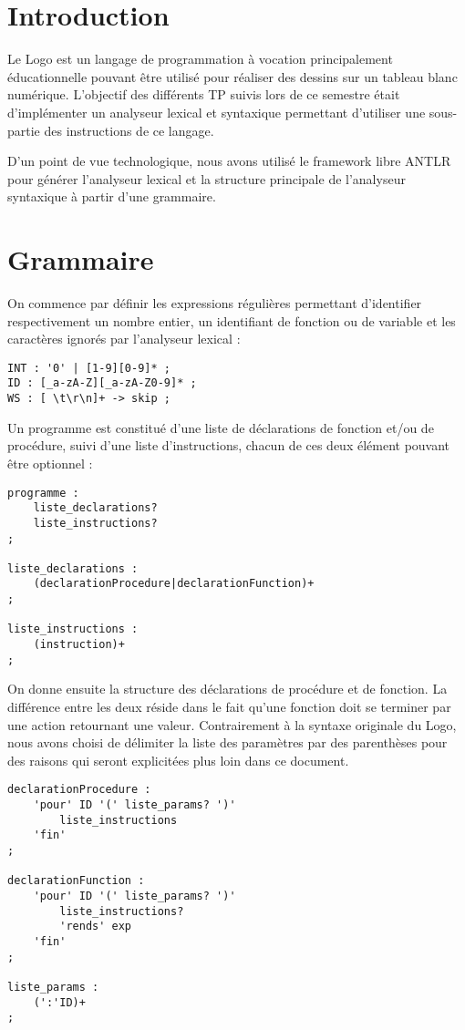 \documentclass[a4paper,11pt]{article}
\begin{document}


\newpage
\section{Introduction}
Le Logo est un langage de programmation à vocation principalement éducationnelle pouvant être utilisé pour réaliser des dessins sur un tableau blanc numérique.
L'objectif des différents TP suivis lors de ce semestre était d'implémenter un analyseur lexical et syntaxique permettant d'utiliser une sous-partie des instructions de ce langage.

D'un point de vue technologique, nous avons utilisé le framework libre ANTLR pour générer l'analyseur lexical et la structure principale de l'analyseur syntaxique à partir d'une grammaire.

\section{Grammaire}
On commence par définir les expressions régulières permettant d'identifier respectivement un nombre entier, un identifiant de fonction ou de variable et les caractères ignorés par l'analyseur lexical :
\begin{lstlisting}
INT : '0' | [1-9][0-9]* ;
ID : [_a-zA-Z][_a-zA-Z0-9]* ;
WS : [ \t\r\n]+ -> skip ;
\end{lstlisting}

Un programme est constitué d'une liste de déclarations de fonction et/ou de procédure, suivi d'une liste d'instructions, chacun de ces deux élément pouvant être optionnel :
\begin{lstlisting}
programme :
    liste_declarations?
    liste_instructions?
;

liste_declarations :
    (declarationProcedure|declarationFunction)+
;

liste_instructions :
    (instruction)+
;
\end{lstlisting}

On donne ensuite la structure des déclarations de procédure et de fonction.
La différence entre les deux réside dans le fait qu'une fonction doit se terminer par une action retournant une valeur.
Contrairement à la syntaxe originale du Logo, nous avons choisi de délimiter la liste des paramètres par des parenthèses pour des raisons qui seront explicitées plus loin dans ce document.
\begin{lstlisting}
declarationProcedure :
    'pour' ID '(' liste_params? ')'
        liste_instructions
    'fin'
;

declarationFunction :
    'pour' ID '(' liste_params? ')'
        liste_instructions?
        'rends' exp
    'fin'
;

liste_params :
    (':'ID)+
;
\end{lstlisting}
\end{document}
